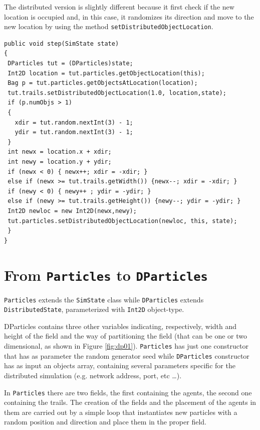 \documentclass{article}
\begin{document}
The distributed version is slightly different because it first check if the new location is occupied and, in this case, it randomizes its direction and move to the new location by using the method \texttt{setDistributedObjectLocation}.


\begin{lstlisting}
public void step(SimState state)
{
 DParticles tut = (DParticles)state;
 Int2D location = tut.particles.getObjectLocation(this);
 Bag p = tut.particles.getObjectsAtLocation(location);
 tut.trails.setDistributedObjectLocation(1.0, location,state);
 if (p.numObjs > 1)
 {
   xdir = tut.random.nextInt(3) - 1; 
   ydir = tut.random.nextInt(3) - 1;
 }
 int newx = location.x + xdir;
 int newy = location.y + ydir;
 if (newx < 0) { newx++; xdir = -xdir; } 
 else if (newx >= tut.trails.getWidth()) {newx--; xdir = -xdir; }
 if (newy < 0) { newy++ ; ydir = -ydir; }
 else if (newy >= tut.trails.getHeight()) {newy--; ydir = -ydir; }
 Int2D newloc = new Int2D(newx,newy);
 tut.particles.setDistributedObjectLocation(newloc, this, state);
 }
}
\end{lstlisting}


\section{From \texttt{Particles} to \texttt{DParticles}}
\texttt{Particles} extends the \texttt{SimState} class  while \texttt{DParticles} extends \texttt{DistributedState}, parameterized with \texttt{Int2D} object-type.

DParticles contains three other variables indicating, respectively, width and height of the field and the way of partitioning the field (that can be one or two dimensional, as shown in Figure \ref{fig:dp01}). \texttt{Particles} has just one constructor that has as parameter the random generator seed while \texttt{DParticles} constructor has as input an objects array, containing several parameters specific for the distributed simulation (e.g. network address, port, etc \ldots). 

In \texttt{Particles} there are two fields, the first containing the agents, the second one containing the trails. The creation of the fields and the placement of the agents in them are carried out by a simple loop that instantiates new particles with a random position and direction and place them in the proper field. 
\end{document}
